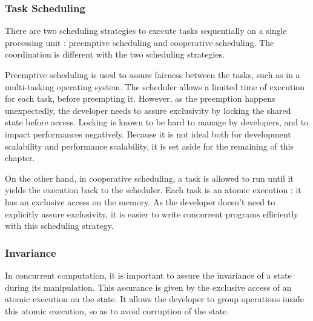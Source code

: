 \subsubsection{Task Scheduling}

There are two scheduling strategies to execute tasks sequentially on a single processing unit : preemptive scheduling and cooperative scheduling.
The coordination is different with the two scheduling strategies.


Preemptive scheduling is used to assure fairness between the tasks, such as in a multi-tasking operating system.
The scheduler allows a limited time of execution for each task, before preempting it.
However, as the preemption happens unexpectedly, the developer needs to assure exclusivity by locking the shared state before access.
Locking is known to be hard to manage by developers, and to impact performances negatively.
Because it is not ideal both for development scalability and performance scalability, it is set aside for the remaining of this chapter.

On the other hand, in cooperative scheduling, a task is allowed to run until it yields the execution back to the scheduler.
Each task is an atomic execution : it has an exclusive access on the memory.
As the developer doesn't need to explicitly assure exclusivity, it is easier to write concurrent programs efficiently with this scheduling strategy.

\subsubsection{Invariance}


In concurrent computation, it is important to assure the invariance of a state during its manipulation.
This assurance is given by the exclusive access of an atomic execution on the state.
It allows the developer to group operations inside this atomic execution, so as to avoid corruption of the state.

